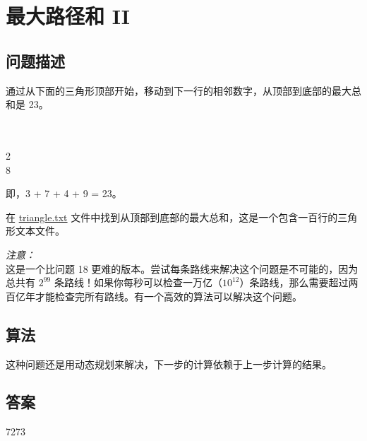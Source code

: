 \section{最大路径和 II}\label{sec:problem67}
\subsection{问题描述}
\begin{tcolorbox}
	通过从下面的三角形顶部开始，移动到下一行的相邻数字，从顶部到底部的最大总和是 23。

	\begin{center}
		\\
		\\
		2\quad{}\\
		8\quad{}
	\end{center}

	即，3 + 7 + 4 + 9 = 23。

	在 \href{https://projecteuler.net/resources/documents/0067_triangle.txt}{triangle.txt} 文件中找到从顶部到底部的最大总和，这是一个包含一百行的三角形文本文件。

	\emph{注意：}\\这是一个比问题 18 更难的版本。尝试每条路线来解决这个问题是不可能的，因为总共有 $2^{99}$
	条路线！如果你每秒可以检查一万亿（$10^{12}$）条路线，那么需要超过两百亿年才能检查完所有路线。有一个高效的算法可以解决这个问题。
\end{tcolorbox}

\subsection{算法}
这种问题还是用动态规划来解决，下一步的计算依赖于上一步计算的结果。

\subsection{答案}
7273
